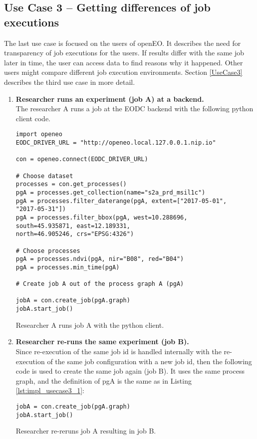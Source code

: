 \documentclass[draft,final]{vutinfth} %
\newenvironment{code}{\captionsetup{type=listing}}{}
\begin{document}
\subsection{Use Case 3 – Getting differences of job executions}\label{Implementation:Use Case3}
The last use case is focused on the users of openEO. It describes the need for transparency of job executions for the users. If results differ with the same job later in time, the user can access data to find reasons why it happened. Other users might compare different job execution environments. Section \ref{UseCase3} describes the third use case in more detail.  
\begin{enumerate}
	\item \textbf{Researcher runs an experiment (job A) at a backend.}\\
	The researcher A runs a job at the EODC backend with the following python client code. 

\begin{code}
	\begin{verbatim}
import openeo
EODC_DRIVER_URL = "http://openeo.local.127.0.0.1.nip.io"

con = openeo.connect(EODC_DRIVER_URL)

# Choose dataset
processes = con.get_processes()
pgA = processes.get_collection(name="s2a_prd_msil1c")
pgA = processes.filter_daterange(pgA, extent=["2017-05-01", 
"2017-05-31"])
pgA = processes.filter_bbox(pgA, west=10.288696, 
south=45.935871, east=12.189331, 
north=46.905246, crs="EPSG:4326")

# Choose processes
pgA = processes.ndvi(pgA, nir="B08", red="B04")
pgA = processes.min_time(pgA)

# Create job A out of the process graph A (pgA)

jobA = con.create_job(pgA.graph)
jobA.start_job()
	\end{verbatim}
	\caption{Researcher A runs job A with the python client.}
	\label{lst:impl_usecase3_1}
\end{code}
	\item \textbf{Researcher re-runs the same experiment (job B).}\\
	Since re-execution of the same job id is handled internally with the re-execution of the same job configuration with a new job id, then the following code is used to create the same job again (job B). It uses the same process graph, and the definition of pgA is the same as in Listing \ref{lst:impl_usecase3_1}:
\begin{code}
	\begin{verbatim}
jobA = con.create_job(pgA.graph)
jobA.start_job()
	\end{verbatim}
	\caption{Researcher re-reruns job A resulting in job B.}
	\label{lst:impl_usecase3_2}
\end{code}
	

\end{enumerate}
\end{document}
